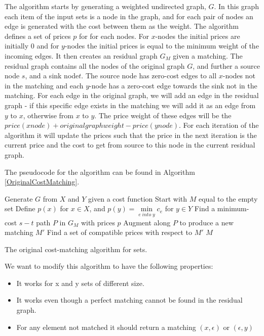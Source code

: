 \documentclass[11pt]{article}
\begin{document}
The \citet{bipartitecost} algorithm starts by generating a weighted undirected graph, $G$. In this graph each item of the input sets is a node in the graph, and for each pair of nodes an edge is generated with the cost between them as the weight. The algorithm defines a set of prices $p$ for for each nodes. For $x$-nodes the initial prices are initially 0 and for $y$-nodes the initial prices is equal to the minimum weight of the incoming edges. It then creates an residual graph $G_M$ given a matching. The residual graph contains all the nodes of the original graph $G$, and further a source node $s$, and a sink node$t$. The source node has zero-cost edges to all $x$-nodes not in the matching and each $y$-node has a zero-cost edge towards the sink not in the matching. For each edge in the original graph, we will add an edge in the residual graph - if this specific edge exists in the matching we will add it as an edge from $y$ to $x$, otherwise from $x$ to $y$. The price weight of these edges will be the $price(xnode)+originalgraphweight-price(ynode)$. For each iteration of the algorithm it will update the prices such that the price in the next iteration is the current price and the cost to get from source to this node in the current residual graph.

The pseudocode for the algorithm can be found in Algorithm \ref{OriginalCostMatching}.


\begin{algorithm}
\begin{algorithmic}
	\State Generate $G$ from $X$ and $Y$ given a cost function
	\State Start with $M$ equal to the empty set
	\State Define $p(x)$ for $x \in X$, and  $p(y) = \underset{e \; into \; y}{\operatorname{min}} c_e$ for $y \in Y$
    	\State Find a minimum-cost $s-t$ path $P$ in $G_M$ with prices $p$
    	\State Augment along $P$ to produce a new matching $M'$
    	\State Find a set of compatible prices with respect to $M'$
    \EndWhile
	\State \Return $M$
\EndFunction
\end{algorithmic}
	\caption{The original cost-matching algorithm for sets.}
	\label{OriginalCostMatching}
\end{algorithm}

We want to modify this algorithm to have the following properties:

\begin{itemize}
\item It works for x and y sets of different size. 
\item It works even though a perfect matching cannot be found in the residual graph.
\item For any element not matched it should return a matching $(x, \epsilon)$ or $(\epsilon, y)$
\end{itemize}
\end{document}
